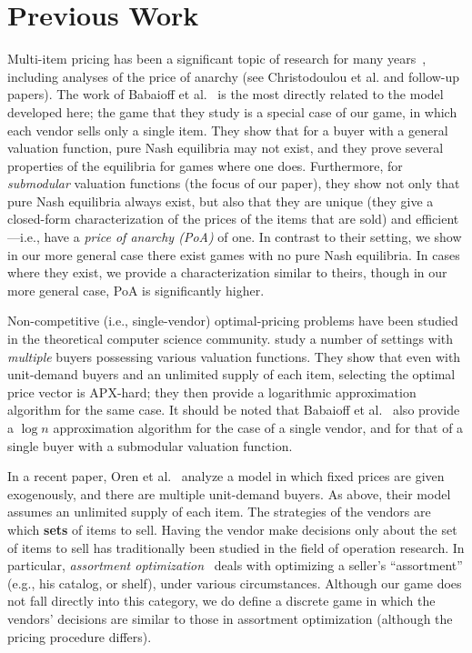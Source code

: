 \section{Previous Work}

Multi-item pricing has been a significant topic  of research for many
years~\cite{HN12,HR12}, including analyses of the price of anarchy
(see Christodoulou et al. \citeyear{CKS08} and follow-up papers).
The work of Babaioff et
al.~\citeyear{BabaioffNL14} is the most directly related to the model
developed here; the game that they study is a special case of
our game, in which each vendor sells only a single item. They show that for a
buyer with a general valuation function, pure Nash equilibria may not
exist, and they prove several properties of the equilibria for games where 
one does. Furthermore, for \emph{submodular} valuation functions (the focus of
our paper), they show not only that pure Nash equilibria always exist,
but also that they are unique (they give a closed-form characterization of
the prices of the items that are sold) and efficient---i.e.,
have a \emph{price of anarchy (PoA)} of one. In contrast
to their setting, we show in
our more general case there exist games with no pure Nash equilibria.
In cases where they exist, we provide a characterization similar to theirs,
though in our more general case, PoA is significantly higher.
 
Non-competitive (i.e., single-vendor) optimal-pricing problems
have been studied in the theoretical computer
science community. \cite{Guruswami:2005:PEP:1070432.1070598} study
a number of settings with \emph{multiple} buyers possessing various
valuation functions. They show that even with unit-demand buyers and an
unlimited supply of each item, selecting the optimal price vector is APX-hard;
they then provide a logarithmic approximation algorithm for the same case. It
should be noted that Babaioff et al.~\citeyear{BabaioffNL14} also provide a $\log n$ approximation
algorithm for the case of a single vendor, and for that of a single buyer with
a submodular valuation function.



In a recent paper, Oren et al.~\citeyear{oren2014game} analyze a model in which
fixed prices are given exogenously, and there are multiple
unit-demand buyers. As above, their model assumes an unlimited supply
of each item.
The strategies of the vendors are which
\textbf{sets} of items to sell. Having the vendor make
decisions only about the set of items to sell has traditionally
been studied in the field of operation research. In particular, 
\emph{assortment optimization}~\cite{schon} deals with optimizing a seller's
``assortment'' (e.g., his catalog, or shelf), under various circumstances.
Although our game does not fall directly into this category, we do define a
discrete game in which the vendors' decisions are similar to
those in assortment
optimization (although the pricing procedure differs).

